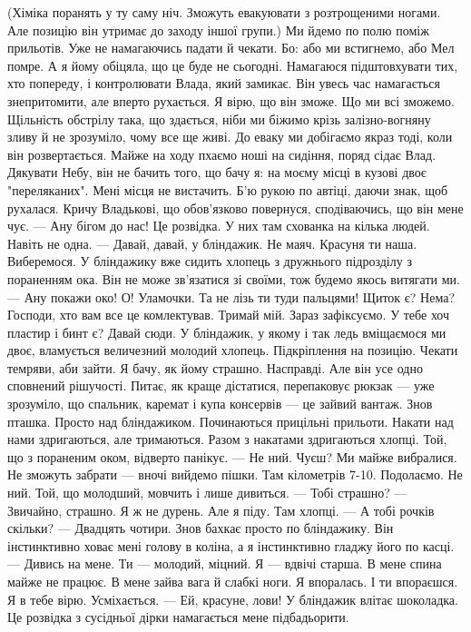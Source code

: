 (Хіміка поранять у ту саму ніч. Зможуть евакуювати з розтрощеними ногами. Але позицію він утримає до заходу іншої групи.)
Ми йдемо по полю поміж прильотів. Уже не намагаючись падати й чекати. Бо: або ми встигнемо, або Мел помре. А я йому обіцяла, що це буде не сьогодні. Намагаюся підштовхувати тих, хто попереду, і контролювати Влада, який замикає. Він увесь час намагається знепритомити, але вперто рухається.  Я вірю, що він зможе. Що ми всі зможемо.  
Щільність обстрілу така, що здається, ніби ми біжимо крізь залізно-вогняну зливу й не зрозуміло, чому все ще живі. 
До еваку ми добігаємо якраз тоді, коли він розвертається. Майже на ходу пхаємо ноші на сидіння, поряд сідає  Влад. Дякувати Небу, він не бачить того, що бачу я: на моєму місці в кузові двоє "переляканих". Мені місця не вистачить. 
Б'ю рукою по автіці, даючи знак, щоб рухалася. Кричу Владькові, що обов'язково повернуся, сподіваючись, що він мене чує. 
— Ану бігом до нас! 
Це розвідка. У них там схованка на кілька людей. Навіть не одна. 
— Давай, давай, у бліндажик. Не маяч. Красуня ти наша. Виберемося. 
У бліндажику вже сидить хлопець з дружнього підрозділу з пораненням ока. Він не може зв'язатися зі своїми, тож будемо якось витягати ми. 
— Ану покажи око! О! Уламочки. Та не лізь ти туди пальцями!  Щиток є? Нема? Господи, хто вам все це комлектував.  Тримай мій. Зараз зафіксуємо. У тебе хоч пластир і бинт є? Давай сюди. 
У бліндажик, у якому і так ледь вміщаємося ми двоє, вламується величезний молодий хлопець.  Підкріплення на позицію. Чекати темряви, аби зайти. 
Я бачу, як йому страшно. Насправді. Але він усе одно сповнений рішучості. Питає, як краще дістатися,  перепаковує рюкзак — уже зрозуміло, що спальник, каремат і купа консервів — це зайвий вантаж. 
Знов пташка.  Просто над бліндажиком. Починаються прицільні прильоти. Накати над нами здригаються, але тримаються. Разом з накатами здригаються хлопці. Той, що з пораненим оком, відверто панікує. 
— Не ний. Чуєш? Ми майже вибралися. Не зможуть забрати — вночі вийдемо пішки. Там кілометрів 7-10. Подолаємо. Не ний. 
Той, що молодший, мовчить і лише дивиться. 
— Тобі страшно?
— Звичайно, страшно. Я ж не дурень. Але я піду. Там хлопці. 
— А тобі рочків скільки?
— Двадцять чотири. 
Знов бахкає просто по бліндажику. Він інстинктивно ховає мені голову в коліна, а я інстинктивно гладжу його по касці. 
— Дивись на мене. Ти — молодий, міцний. Я — вдвічі старша. В мене спина майже не працює. В мене зайва вага й слабкі ноги. Я впоралась. І ти впораєшся. Я в тебе вірю. 
Усміхається. 
 — Ей, красуне, лови! 
У бліндажик влітає шоколадка. Це розвідка з сусідньої дірки намагається мене підбадьорити. 
